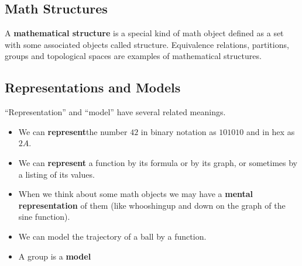     \subsection{Math Structures}
        A \textbf{mathematical structure} is a special kind of math object
        defined as a set with some associated objects called structure.
        Equivalence relations, partitions, groups and topological spaces are
        examples of mathematical structures.

    \subsection{Representations and Models}
        “Representation” and “model” have several related meanings.

        \begin{itemize}
            \item{We can \textbf{represent}the number $42$ in binary notation as $101010$ and in hex as $2A$.}

            \item{We can \textbf{represent} a function by its formula or by its graph,
                  or sometimes by a listing of its values.}

            \item{When we think about some math objects we may have a
                  \textbf{mental representation} of them (like whooshingup
                  and down on the graph of the sine function).}

            \item{We can model the trajectory of a ball by a function.}
            \item{A group is a \textbf{model}}
        \end{itemize}
